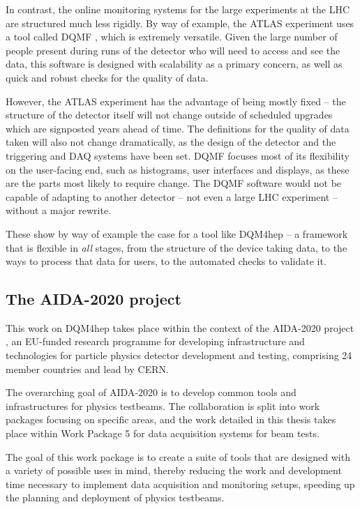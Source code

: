 In contrast, the online monitoring systems for the large experiments at the \acrshort{LHC} are structured much less rigidly. By way of example, the \acrshort{ATLAS} experiment uses a tool called \acrfull{DQMF} \cite{atlas-monitoring}, which is extremely versatile. Given the large number of people present during runs of the detector who will need to access and see the data, this software is designed with scalability as a primary concern, as well as quick and robust checks for the quality of data.

However, the \acrshort{ATLAS} experiment has the advantage of being mostly fixed -- the structure of the detector itself will not change outside of scheduled upgrades which are signposted years ahead of time. The definitions for the quality of data taken will also not change dramatically, as the design of the detector and the triggering and \acrshort{DAQ} systems have been set. \acrshort{DQMF} focuses most of its flexibility on the user-facing end, such as histograms, user interfaces and displays, as these are the parts most likely to require change. The \acrshort{DQMF} software would not be capable of adapting to another detector -- not even a large \acrshort{LHC} experiment -- without a major rewrite.

These show by way of example the case for a tool like \acrshort{DQM4hep} -- a framework that is flexible in \textit{all} stages, from the structure of the device taking data, to the ways to process that data for users, to the automated checks to validate it.

\subsection{The \acrshort{AIDA}-2020 project}
This work on \acrshort{DQM4hep} takes place within the context of the \acrshort{AIDA}-2020 project \cite{aida-2020}, an EU-funded research programme for developing infrastructure and technologies for particle physics detector development and testing, comprising 24 member countries and lead by \acrshort{CERN}.

The overarching goal of \acrshort{AIDA}-2020 is to develop common tools and infrastructures for physics testbeams. The collaboration is split into work packages focusing on specific areas, and the work detailed in this thesis takes place within Work Package 5 for data acquisition systems for beam tests.

The goal of this work package is to create a suite of tools that are designed with a variety of possible uses in mind, thereby reducing the work and development time necessary to implement data acquisition and monitoring setups, speeding up the planning and deployment of physics testbeams. 

